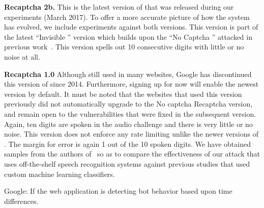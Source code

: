 \textbf{Recaptcha 2b.} This is the latest version of \re that was released during our experiments (March 2017). 
To offer a more accurate picture of how the system has evolved, we include experiments against both versions.
This version is part of the latest ``Invisible \re'' version which builds upon the ``No Captcha \re'' attacked in 
previous work~\cite{sivakorn:eurosp16}. This version spells out 10 consecutive digits with little or no noise at all.

\textbf{Recaptcha 1.0} Although still used in many websites, Google has discontinued this version of \re since 2014.
Furthermore, signing up for \re now will enable the newest version by default. It must be
noted that the websites that used this version previously did not automatically upgrade to the No 
captcha Recaptcha version, and remain open to the vulnerabilities that were fixed in the subsequent 
version. Again, ten digits are spoken in the audio challenge and there is very little or no noise. This 
version does not enforce any rate limiting unlike the newer versions of \re. The margin for error 
is again 1 out of the 10 spoken digits. We have obtained  samples from the authors 
of~\cite{meutzner2014using} so as to compare the effectiveness of our attack that uses 
off-the-shelf speech recognition systems against previous studies that used custom
machine learning classifiers.

 Google: If the web application is detecting bot behavior based upon time differences.

